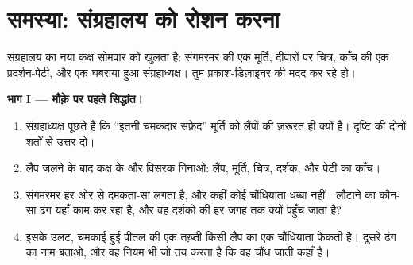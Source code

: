 \section{समस्या: संग्रहालय को रोशन करना}

\begin{problem}\label{pb:g7:light-sources-propagation:1}
संग्रहालय का नया कक्ष सोमवार को खुलता है: संगमरमर की एक मूर्ति,
दीवारों पर चित्र, काँच की एक प्रदर्शन-पेटी, और एक घबराया हुआ
संग्रहाध्यक्ष। तुम प्रकाश-डिज़ाइनर की मदद कर रहे हो।

\medskip\noindent\textbf{भाग I --- मौक़े पर पहले सिद्धांत।}
\begin{enumerate}
  \item संग्रहाध्यक्ष पूछते हैं कि ``इतनी चमकदार सफ़ेद'' मूर्ति को
        लैंपों की ज़रूरत ही क्यों है। दृष्टि की दोनों शर्तों से उत्तर
        दो।
  \item लैंप जलने के बाद कक्ष के  और विसरक गिनाओ: लैंप,
        मूर्ति, चित्र, दर्शक, और पेटी का काँच।
  \item संगमरमर हर ओर से दमकता-सा लगता है, और कहीं कोई चौंधियाता
        धब्बा नहीं।  लौटाने का कौन-सा ढंग यहाँ काम कर रहा है,
        और वह दर्शकों की हर जगह तक क्यों पहुँच जाता है?
  \item इसके उलट, चमकाई हुई पीतल की एक तख़्ती किसी लैंप का एक
        चौंधियाता  फेंकती है। दूसरे ढंग का नाम बताओ, और वह
        नियम भी जो तय करता है कि वह चौंध जाती कहाँ है।
\end{enumerate}


\end{problem}

